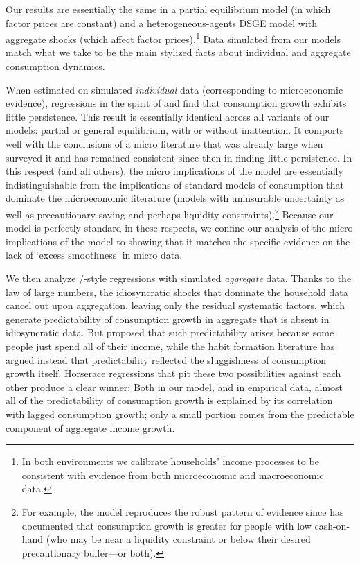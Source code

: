 \documentclass[titlepage]{\econtex}\newcommand{\texname}{cAndCwithStickyE}
\begin{document}
Our results are essentially the same in a partial equilibrium model (in which factor prices are constant) and a heterogeneous-agents DSGE model with aggregate shocks (which affect factor prices).\footnote{In both environments we calibrate households' income processes to be consistent with evidence from both microeconomic and macroeconomic data.}  Data simulated from our models match what we take to be the main stylized facts about individual and aggregate consumption dynamics.

When estimated on simulated \emph{individual} data (corresponding to microeconomic evidence), regressions in the spirit of \cite{hallRandomWalk} and \cite{cmModel} find that consumption growth exhibits little persistence.  This result is essentially identical across all variants of our models: partial or general equilibrium, with or without inattention. It comports well with the conclusions of a micro literature that was already large when \cite{deatonUnderstandingC} surveyed it and has remained consistent since then in finding little persistence.  In this respect (and all others), the micro implications of the model are essentially indistinguishable from the implications of standard models of consumption that dominate the microeconomic literature (models with uninsurable uncertainty as well as precautionary saving and perhaps liquidity constraints).\footnote{For example, the model reproduces the robust pattern of evidence since \cite{zeldes:jpe} has documented that consumption growth is greater for people with low cash-on-hand (who may be near a liquidity constraint or below their desired precautionary buffer---or both).}  Because our model is perfectly standard in these respects, we confine our analysis of the micro implications of the model to showing that it matches the specific evidence on the lack of `excess smoothness' in micro data.

We then analyze \cite{hallRandomWalk}/\cite{cmModel}-style regressions with simulated \emph{aggregate} data. Thanks to the law of large numbers, the idiosyncratic shocks that dominate the household data cancel out upon aggregation, leaving only the residual systematic factors, which generate predictability of consumption growth in aggregate that is absent in idiosyncratic data.  But \cite{cmModel} proposed that such predictability arises because some people just spend all of their income, while the habit formation literature has argued instead that predictability reflected the sluggishness of consumption growth itself.  Horserace regressions that pit these two possibilities against each other produce a clear winner: Both in our model, and in empirical data, almost all of the predictability of consumption growth is explained by its correlation with lagged consumption growth; only a small portion comes from the predictable component of aggregate income growth.
\end{document}

